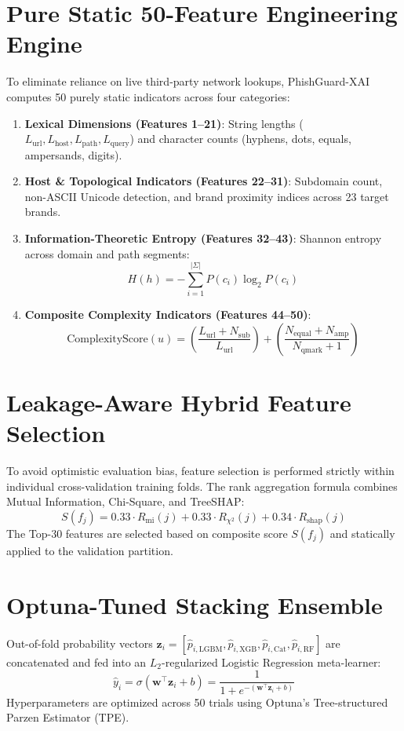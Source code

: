 \documentclass[12pt,a4paper,oneside]{report}
\begin{document}
\section{Pure Static 50-Feature Engineering Engine}
To eliminate reliance on live third-party network lookups, PhishGuard-XAI computes 50 purely static indicators across four categories:
\begin{enumerate}
    \item \textbf{Lexical Dimensions (Features 1--21)}: String lengths ($L_{\text{url}}, L_{\text{host}}, L_{\text{path}}, L_{\text{query}}$) and character counts (hyphens, dots, equals, ampersands, digits).
    \item \textbf{Host \& Topological Indicators (Features 22--31)}: Subdomain count, non-ASCII Unicode detection, and brand proximity indices across 23 target brands.
    \item \textbf{Information-Theoretic Entropy (Features 32--43)}: Shannon entropy across domain and path segments:
    \begin{equation}
        H(h) = -\sum_{i=1}^{|\Sigma|} P(c_i) \log_2 P(c_i)
    \end{equation}
    \item \textbf{Composite Complexity Indicators (Features 44--50)}:
    \begin{equation}
        \text{ComplexityScore}(u) = \left( \frac{L_{\text{url}} + N_{\text{sub}}}{L_{\text{url}}} \right) + \left( \frac{N_{\text{equal}} + N_{\text{amp}}}{N_{\text{qmark}} + 1} \right)
    \end{equation}
\end{enumerate}

\section{Leakage-Aware Hybrid Feature Selection}
To avoid optimistic evaluation bias, feature selection is performed strictly within individual cross-validation training folds. The rank aggregation formula combines Mutual Information, Chi-Square, and TreeSHAP:
\begin{equation}
    S(f_j) = 0.33 \cdot R_{\text{mi}}(j) + 0.33 \cdot R_{\chi^2}(j) + 0.34 \cdot R_{\text{shap}}(j)
\end{equation}
The Top-30 features are selected based on composite score $S(f_j)$ and statically applied to the validation partition.

\section{Optuna-Tuned Stacking Ensemble}
Out-of-fold probability vectors $\mathbf{z}_i = [\hat{p}_{i,\text{LGBM}}, \hat{p}_{i,\text{XGB}}, \hat{p}_{i,\text{Cat}}, \hat{p}_{i,\text{RF}}]$ are concatenated and fed into an $L_2$-regularized Logistic Regression meta-learner:
\begin{equation}
    \hat{y}_i = \sigma(\mathbf{w}^\top \mathbf{z}_i + b) = \frac{1}{1 + e^{-(\mathbf{w}^\top \mathbf{z}_i + b)}}
\end{equation}
Hyperparameters are optimized across 50 trials using Optuna's Tree-structured Parzen Estimator (TPE).
\end{document}
